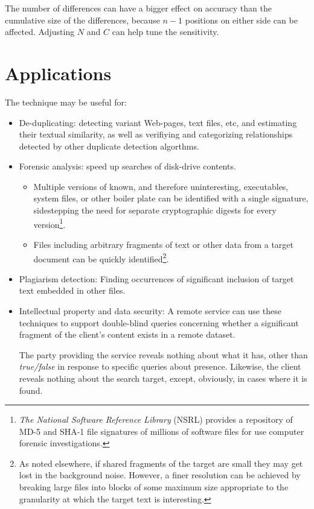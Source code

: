 \documentclass[html]{article}    %
\begin{document}
The number of differences can have a bigger effect on accuracy than the cumulative size of the differences, because 
$n-1$ positions on either side can be affected.
Adjusting $N$ and $C$ can help tune the sensitivity.

\section{Applications}
The technique may be useful for:
\begin{itemize}
  \item { De-duplicating: detecting variant Web-pages, text files, etc, and estimating their textual similarity, as well as verifiying 
	and categorizing relationships detected by other duplicate detection algorthms.
  }
  \item {Forensic analysis: speed up searches of disk-drive contents.
		\begin{itemize}
 		\item{ 
  			Multiple versions of known, and therefore uninteresting, executables, system files, or other boiler plate can 
			be identified with a single signature, sidestepping the need for separate cryptographic digests for 
  			every version\footnote{
 				{\em The National Software Reference Library} (NSRL) provides a repository
 					of MD-5 and SHA-1 file signatures of millions of software files for use
 					computer forensic investigations. 
				}. 
  		}
  		\item{
  			Files including arbitrary fragments of text or other data from a target document can be quickly identified\footnote{
  				As noted elsewhere, if shared fragments of the target are small they may get lost in the background noise.  
				However, a finer resolution can be achieved by breaking large files into blocks of some maximum size 
				appropriate to the granularity at which the target text is interesting.
			}. 
  		}
		\end{itemize}
  }
  \item {Plagiarism detection: Finding occurrences of significant 
  	inclusion of target text embedded in other files.  
  	}
  \item{Intellectual property and data security: A remote service can use these
  		techniques to support double-blind queries concerning whether a significant fragment of the client's content exists in a remote dataset. 
  		
  		The party providing the service reveals nothing about what it has, other than {\em true/false} in response to specific queries about presence.
  		Likewise, the client reveals nothing about the search target, except, obviously, in cases where it is found. 
  		
}
\end{itemize}
\end{document}
